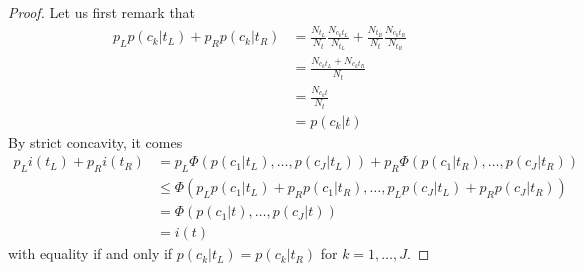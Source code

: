 \begin{proof}
Let us first remark that
\begin{align*}
p_L p(c_k|t_L) + p_R p(c_k|t_R) &= \frac{N_{t_L}}{N_t} \frac{N_{c_kt_L}}{N_{t_L}} +  \frac{N_{t_R}}{N_t} \frac{N_{c_kt_R}}{N_{t_R}} \\
                                &= \frac{N_{c_kt_L} + N_{c_kt_R}}{N_t} \\
                                &= \frac{N_{c_kt}}{N_t} \\
                                &= p(c_k|t)
\end{align*}
By strict concavity, it comes
\begin{align*}
p_L i(t_L) + p_R i(t_R) &= p_L \Phi(p(c_1|t_L), \dots, p(c_J|t_L)) + p_R \Phi(p(c_1|t_R), \dots, p(c_J|t_R)) \\
                        &\leq \Phi(p_L p(c_1|t_L) + p_R p(c_1|t_R), \dots, p_L p(c_J|t_L) + p_R p(c_J|t_R)) \\
                        &= \Phi(p(c_1|t), \dots, p(c_J|t)) \\
                        &= i(t)
\end{align*}
with equality if and only
if $p(c_k|t_L)=p(c_k|t_R)$ for $k=1,\dots,J$.
\end{proof}

